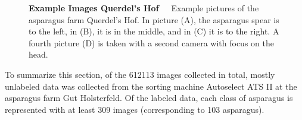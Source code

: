 \begin{figure}[h]
    \centering
    \qquad
    \qquad
    \qquad
    \caption[Example Asparagus Images Querdel's Hof]{\textbf{Example Images Querdel's Hof}~~~Example pictures of the asparagus farm Querdel's Hof. In picture (A), the asparagus spear is to the left, in (B), it is in the middle, and in (C) it is to the right. A fourth picture (D) is taken with a second camera with focus on the head.}
    \label{fig:ExampleImagesQuerdel}
\end{figure}

To summarize this section, of the 612113 images collected in total, mostly unlabeled data was collected from the sorting machine Autoselect ATS II at the asparagus farm Gut Holsterfeld. Of the labeled data, each class of asparagus is represented with at least 309 images (corresponding to 103 asparagus).


